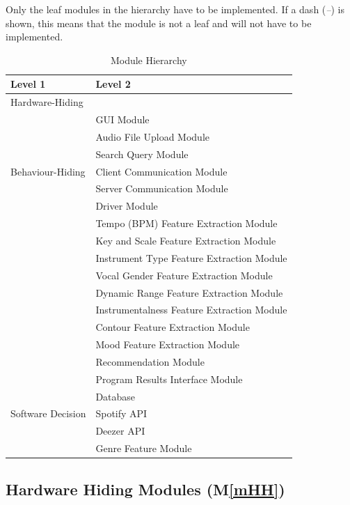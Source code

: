 \documentclass[12pt, titlepage]{article}
\newcommand{\mref}[1]{M\ref{#1}}
\begin{document}
Only the leaf modules in the hierarchy have to be implemented. If a dash
(\emph{--}) is shown, this means that the module is not a leaf and will not have
to be implemented.

\begin{table}[h!]
  \centering
  \begin{tabular}{p{} p{}}
  \toprule
  \textbf{Level 1} & \textbf{Level 2}\\
  \midrule
  
  {Hardware-Hiding} & ~ \\
  \midrule
  
  \multirow{7}{0.3\textwidth}{Behaviour-Hiding} & GUI Module\\
  & Audio File Upload Module\\
  & Search Query Module\\
  & Client Communication Module\\
  & Server Communication Module\\
  & Driver Module\\
  & Tempo (BPM) Feature Extraction Module\\
  & Key and Scale Feature Extraction Module\\
  & Instrument Type Feature Extraction Module\\
  & Vocal Gender Feature Extraction Module\\
  & Dynamic Range Feature Extraction Module\\
  & Instrumentalness Feature Extraction Module\\
  & Contour Feature Extraction Module\\
  & Mood Feature Extraction Module\\
  & Recommendation Module\\
  & Program Results Interface Module\\
  \midrule
  
  \multirow{3}{0.3\textwidth}{Software Decision} & Database\\
  & Spotify API\\
  & Deezer API\\
  & Genre Feature Module\\
  \bottomrule
  
  \end{tabular}
  \caption{Module Hierarchy}
  \label{TblMH}
  \end{table}

\subsection{Hardware Hiding Modules (\mref{mHH})}
\end{document}
